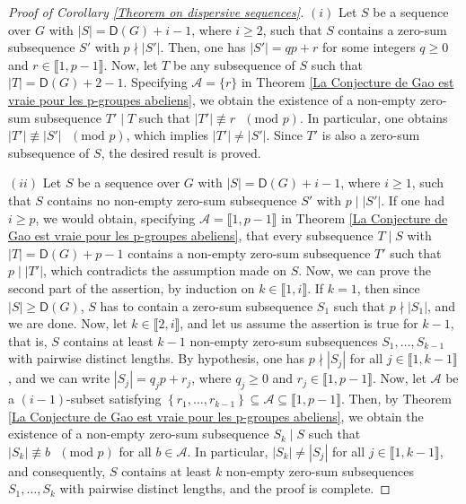 \documentclass[english,12pt,a4paper,twoside]{smfart}
\theoremstyle{plain}
\theoremstyle{definition}
\theoremstyle{remark}
\begin{document}
\begin{proof}[Proof of Corollary \ref{Theorem on dispersive sequences}] $(i)$ Let $S$ be a sequence over $G$ with $\left|S\right| = \mathsf{D}(G)+i-1$, where $i \geq 2$, such that $S$ contains a zero-sum subsequence $S'$ with $p \nmid \left|S'\right|$. Then, one has $\left|S'\right| = qp + r$ for some integers $q \geq 0$ and $r \in \llbracket 1,p-1 \rrbracket$. Now, let $T$ be any subsequence of $S$ such that $\left|T\right| = \mathsf{D}(G) + 2 -1$. Specifying $\mathcal{A}=\{r\}$ in Theorem \ref{La Conjecture de Gao est vraie pour les p-groupes abeliens}, we obtain the existence of a non-empty zero-sum subsequence $T' \mid T$ such that $\left|T'\right| \not\equiv r \text{ } (\text{mod } p)$. In particular, one obtains $\left|T'\right| \not\equiv \left|S'\right| \text{ } (\text{mod } p)$, which implies $\left|T'\right| \neq \left|S'\right|$. Since $T'$ is also a zero-sum subsequence of $S$, the desired result is proved. 

\medskip
\noindent $(ii)$ Let $S$ be a sequence over $G$ with $\left|S\right| = \mathsf{D}(G)+i-1$, where $i \geq 1$, such that $S$  contains no non-empty zero-sum subsequence $S'$ with $p \mid \left|S'\right|$. If one had $i \geq p$, we would obtain, specifying $\mathcal{A}=\llbracket 1,p-1 \rrbracket$ in Theorem \ref{La Conjecture de Gao est vraie pour les p-groupes abeliens}, that every subsequence $T \mid S$ with $\left|T\right| = \mathsf{D}(G)+p-1$ contains a non-empty zero-sum subsequence $T'$ such that $p \mid \left|T'\right|$, which contradicts the assumption made on $S$. Now, we can prove the second part of the assertion, by induction on $k \in \llbracket 1,i \rrbracket$. If $k=1$, then since $\left|S\right| \geq \mathsf{D}(G)$, $S$ has to contain a zero-sum subsequence $S_1$ such that $p \nmid \left|S_1\right|$, and we are done. Now, let $k \in \llbracket 2,i \rrbracket$, and let us assume the assertion is true for $k-1$, that is, $S$ contains at least $k-1$ non-empty zero-sum subsequences $S_1,\dots,S_{k-1}$ with pairwise distinct lengths. By hypothesis, one has $p \nmid \left|S_j\right|$ for all $j \in \llbracket 1,k-1 \rrbracket$, and we can write $\left|S_j\right| = q_jp + r_j$, where $q_j \geq 0$ and $r_j \in \llbracket 1,p-1 \rrbracket$. Now, let $\mathcal{A}$ be a $(i-1)$-subset satisfying $\left\{r_1,\dots,r_{k-1}\right\} \subseteq \mathcal{A} \subseteq \llbracket 1,p-1 \rrbracket$. Then, by Theorem \ref{La Conjecture de Gao est vraie pour les p-groupes abeliens}, we obtain the existence of a non-empty zero-sum subsequence $S_k \mid S$ such that $\left|S_k\right| \not\equiv b \text{ } (\text{mod } p)$ for all $b \in \mathcal{A}$. In particular, $\left|S_k\right| \neq \left|S_j\right|$ for all $j \in \llbracket 1,k-1 \rrbracket$, and consequently, $S$ contains at least $k$ non-empty zero-sum subsequences $S_1,\dots,S_k$ with pairwise distinct lengths, and the proof is complete. 
\end{proof}
\end{document}
